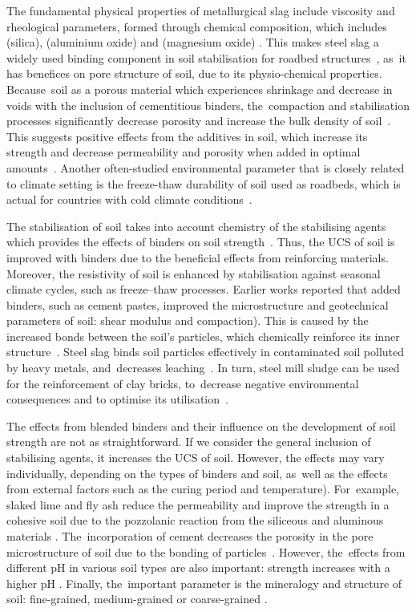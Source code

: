 \documentclass[electronics,article,accept,pdftex,moreauthors]{Definitions/mdpi}
\begin{document}
The fundamental physical properties of metallurgical slag include viscosity and rheological parameters, formed through chemical composition, which includes  (silica),  (aluminium oxide) and  (magnesium oxide) \cite{Slezak}. This makes steel slag a widely used {binding} component in soil stabilisation for roadbed structures~\cite{Mraz,Lindh2004,Erdenebold}, as~it has {benefices} on pore structure of soil, due to its {physio-chemical} properties. Because~soil as a porous{ }material {which experiences} shrinkage and decrease in voids with the inclusion of cementitious binders, the~compaction and stabilisation processes significantly decrease porosity and increase {the} bulk density of soil~\cite{Bhattacharjee}. This suggests positive {effects} from {the} additives in soil, which increase its strength and decrease permeability and porosity when added in optimal amounts~\cite{Ozelim,Lindh}. Another often-studied environmental parameter that is closely related to climate setting is the freeze-thaw durability of soil used as roadbeds, which is actual for countries with cold climate conditions~\cite{Su,Sahlabadi}. 

{The stabilisation of soil takes into account }chemistry of {the} stabilising agents {which provides the} effects of binders on soil strength~\cite{Bowers}. {Thus, the} UCS of soil {is improved with binders due to the} beneficial effects from reinforcing materials. {Moreover, }the resistivity of soil {is enhanced by stabilisation against} seasonal climate cycles, such as freeze--thaw processes. Earlier works reported that {added binders}, such as cement pastes{, improved the} microstructure and geotechnical parameters of soil{: }shear modulus {and} compaction). {This is caused by} the increased bonds between the soil's particles, which chemically reinforce its inner structure~\cite{Ghorbani,Rajabi,Zhangetal2018}. {Steel slag} binds soil particles effectively in contaminated soil polluted by heavy metals, and~decreases leaching~\cite{Negim,Lindh2022d,Moon}. In{ }turn, steel mill sludge can be used for the reinforcement of clay bricks, to~decrease negative environmental consequences{ }and to optimise its utilisation~\cite{Sarani}.

The effects from blended binders and their influence on the development of soil strength are not as straightforward. {If we consider }the general{ }inclusion of stabilising agents{, it }increases the UCS of soil{. However, }the effects may vary individually{, }depending on the types of binders and soil{, as~well as the effects from }external factors{ such as} the curing period and temperature). For~example, slaked lime and fly ash{ }reduce the permeability and improve{ }the strength in {a} cohesive soil due to {the} pozzolanic reaction from {the} siliceous and aluminous {materials} \cite{Sharma2012}. The~incorporation of cement decreases the porosity in the pore microstructure of soil due to the bonding of particles~\cite{Inyang,Consoli}. However, the~effects from {different pH in various }soil types {are} also {important: strength increases with a} higher pH{ }\cite{Gori,Ghobadi}. {Finally, the~important parameter is the mineralogy and structure of soil}{: }fine{-}grained, medium{-}grained or coarse-grained{ }\cite{Malikzada}. 
\end{document}
